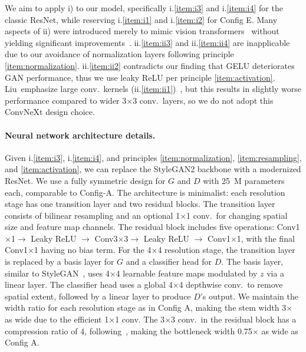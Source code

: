 We aim to apply i) to our model, specifically i.\ref{item:i3} and i.\ref{item:i4} for the classic ResNet, while reserving i.\ref{item:i1} and i.\ref{item:i2} for Config E. Many aspects of ii) were introduced merely to mimic vision transformers~\cite{swin,vit} without yielding significant improvements~\cite{convnext}. ii.\ref{item:ii3} and ii.\ref{item:ii4} are inapplicable due to our avoidance of normalization layers following principle \ref{item:normalization}. ii.\ref{item:ii2} contradicts our finding that GELU deteriorates GAN performance, thus we use leaky ReLU per principle \ref{item:activation}. Liu~\etal emphasize large conv.~kernels (ii.\ref{item:ii1})~\cite{convnext}, but this results in slightly worse performance compared to wider 3$\times$3 conv.~layers, so we do not adopt this ConvNeXt design choice.

\paragraph{Neural network architecture details.} Given i.\ref{item:i3}, i.\ref{item:i4}, and principles \ref{item:normalization}, \ref{item:resampling}, and \ref{item:activation}, we can replace the StyleGAN2 backbone with a modernized ResNet. We use a fully symmetric design for $G$ and $D$ with 25\ M parameters each, comparable to Config-A. The architecture is minimalist: each resolution stage has one transition layer and two residual blocks. The transition layer consists of bilinear resampling and an optional 1$\times$1 conv.~for changing spatial size and feature map channels. The residual block includes five operations: Conv1$\times$1$\rightarrow$ Leaky ReLU $\rightarrow$ Conv3$\times$3$\rightarrow$ Leaky ReLU $\rightarrow$ Conv1$\times$1, with the final Conv1$\times$1 having no bias term. For the 4$\times$4 resolution stage, the transition layer is replaced by a basis layer for $G$ and a classifier head for $D$. The basis layer, similar to StyleGAN~\cite{sg1,sg2}, uses 4$\times$4 learnable feature maps modulated by $z$ via a linear layer. The classifier head uses a global 4$\times$4 depthwise conv.~to remove spatial extent, followed by a linear layer to produce $D$'s output. We maintain the width ratio for each resolution stage as in Config A, making the stem width 3$\times$ as wide due to the efficient 1$\times$1 conv. The 3$\times$3 conv.~in the residual block has a compression ratio of 4, following~\cite{resnet,resnet2}, making the bottleneck width 0.75$\times$ as wide as Config A.
